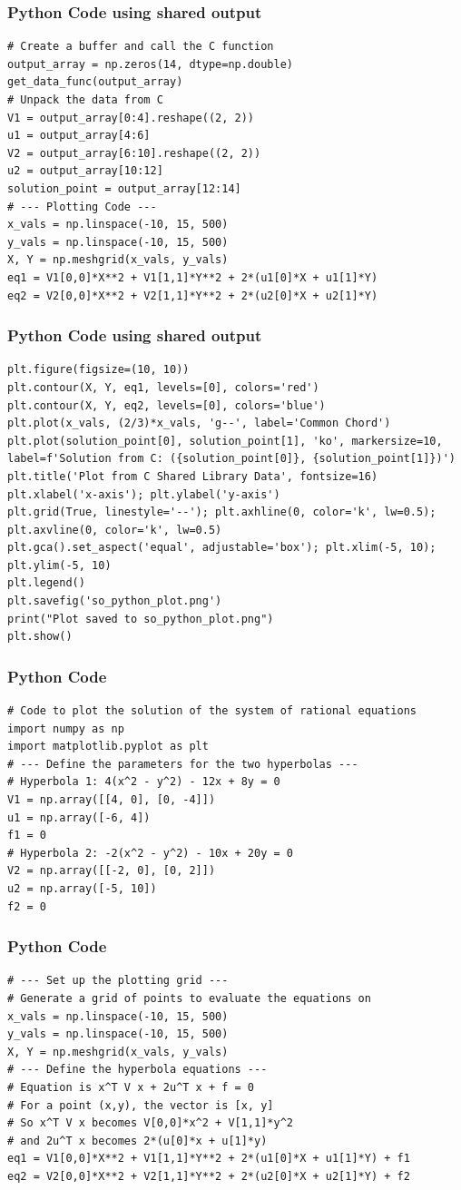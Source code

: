 \documentclass{beamer}
\begin{document}
	
	\begin{frame}[fragile]
		\frametitle{Python Code using shared output}
		\begin{lstlisting}
# Create a buffer and call the C function
output_array = np.zeros(14, dtype=np.double)			get_data_func(output_array)
# Unpack the data from C
V1 = output_array[0:4].reshape((2, 2))
u1 = output_array[4:6]
V2 = output_array[6:10].reshape((2, 2))
u2 = output_array[10:12]
solution_point = output_array[12:14]
# --- Plotting Code ---
x_vals = np.linspace(-10, 15, 500)
y_vals = np.linspace(-10, 15, 500)
X, Y = np.meshgrid(x_vals, y_vals)
eq1 = V1[0,0]*X**2 + V1[1,1]*Y**2 + 2*(u1[0]*X + u1[1]*Y)
eq2 = V2[0,0]*X**2 + V2[1,1]*Y**2 + 2*(u2[0]*X + u2[1]*Y)		
		\end{lstlisting}
	\end{frame}
	\begin{frame}[fragile]
		\frametitle{Python Code using shared output}
		\begin{lstlisting}		
plt.figure(figsize=(10, 10))
plt.contour(X, Y, eq1, levels=[0], colors='red')
plt.contour(X, Y, eq2, levels=[0], colors='blue')
plt.plot(x_vals, (2/3)*x_vals, 'g--', label='Common Chord')
plt.plot(solution_point[0], solution_point[1], 'ko', markersize=10, label=f'Solution from C: ({solution_point[0]}, {solution_point[1]})')
plt.title('Plot from C Shared Library Data', fontsize=16)
plt.xlabel('x-axis'); plt.ylabel('y-axis')
plt.grid(True, linestyle='--'); plt.axhline(0, color='k', lw=0.5); plt.axvline(0, color='k', lw=0.5)
plt.gca().set_aspect('equal', adjustable='box'); plt.xlim(-5, 10); plt.ylim(-5, 10)
plt.legend()
plt.savefig('so_python_plot.png')
print("Plot saved to so_python_plot.png")
plt.show()			
		\end{lstlisting}
	\end{frame}
	\begin{frame}[fragile]
		\frametitle{Python Code}
		\begin{lstlisting}
# Code to plot the solution of the system of rational equations
import numpy as np
import matplotlib.pyplot as plt
# --- Define the parameters for the two hyperbolas ---
# Hyperbola 1: 4(x^2 - y^2) - 12x + 8y = 0
V1 = np.array([[4, 0], [0, -4]])
u1 = np.array([-6, 4])
f1 = 0
# Hyperbola 2: -2(x^2 - y^2) - 10x + 20y = 0
V2 = np.array([[-2, 0], [0, 2]])
u2 = np.array([-5, 10])
f2 = 0		
		\end{lstlisting}
	\end{frame}
	\begin{frame}[fragile]
		\frametitle{Python Code}
	\begin{lstlisting}
# --- Set up the plotting grid ---
# Generate a grid of points to evaluate the equations on
x_vals = np.linspace(-10, 15, 500)
y_vals = np.linspace(-10, 15, 500)
X, Y = np.meshgrid(x_vals, y_vals)
# --- Define the hyperbola equations ---
# Equation is x^T V x + 2u^T x + f = 0
# For a point (x,y), the vector is [x, y]
# So x^T V x becomes V[0,0]*x^2 + V[1,1]*y^2
# and 2u^T x becomes 2*(u[0]*x + u[1]*y)
eq1 = V1[0,0]*X**2 + V1[1,1]*Y**2 + 2*(u1[0]*X + u1[1]*Y) + f1
eq2 = V2[0,0]*X**2 + V2[1,1]*Y**2 + 2*(u2[0]*X + u2[1]*Y) + f2
	\end{lstlisting}
	
\end{frame}
\end{document}
